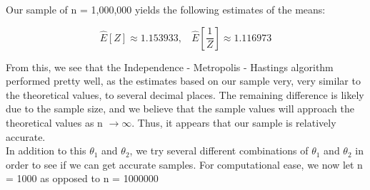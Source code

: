 \documentclass[12pt]{article}
\begin{document}
\begin{description}
Our sample of n = 1,000,000 yields the following estimates of the means:

\[\hat{E}[Z] \approx 1.153933, \ \ \ \ \hat{E}\left[\frac{1}{Z}\right] \approx 1.116973\]

From this, we see that the Independence - Metropolis - Hastings algorithm performed pretty well, as the estimates based on our sample very, very similar to the theoretical values, to several decimal places. The remaining difference is likely due to the sample size, and we believe that the sample values will approach the theoretical values as n $\rightarrow \infty$. Thus, it appears that our sample is relatively accurate. \\

In addition to this $\theta_1$ and $\theta_2$, we try several different combinations of $\theta_1$ and $\theta_2$ in order to see if we can get accurate samples. For computational ease, we now let n = 1000 as opposed to n = 1000000 

\end{description}
\end{document}
